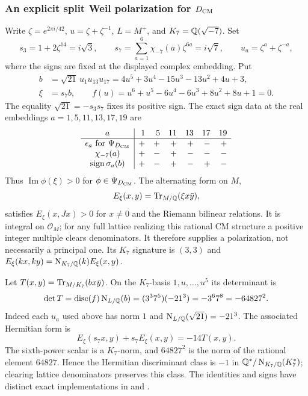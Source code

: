 \subsubsection{An explicit split Weil polarization for ${D_{\mathrm{CM}}}$}
Write $\zeta=e^{2\pi i/42}$, $u=\zeta+\zeta^{-1}$,
$L=M^+$, and $K_7=\mathbb Q(\sqrt{-7})$. Set
\[
 s_3=1+2\zeta^{14}=i\sqrt3,\qquad
 s_7=\sum_{a=1}^{6}\chi_{-7}(a)\zeta^{6a}=i\sqrt7,
 \qquad u_a=\zeta^a+\zeta^{-a},
\]
where the signs are fixed at the displayed complex embedding. Put
\begin{align*}
 b&=\sqrt{21}\,u_1u_{13}u_{17}
   =4u^5+3u^4-15u^3-13u^2+4u+3,\\
 \xi&=s_7b,\qquad
 f(u)=u^6+u^5-6u^4-6u^3+8u^2+8u+1=0.
\end{align*}
The equality $\sqrt{21}=-s_3s_7$ fixes its positive sign. The exact
sign data at the real embeddings $a=1,5,11,13,17,19$ are
\[
\begin{array}{c|rrrrrr}
 a&1&5&11&13&17&19\\\hline
 \epsilon_a\text{ for }\Psi_{D_{\mathrm{CM}}}&+&+&+&+&-&+\\
 \chi_{-7}(a)&+&-&+&-&-&-\\
 \operatorname{sign}\sigma_a(b)&+&-&+&-&+&-
\end{array}
\]
Thus $\operatorname{Im}\phi(\xi)>0$ for $\phi\in\Psi_{D_{\mathrm{CM}}}$.
The alternating form on $M$,
\[
 E_\xi(x,y)=\operatorname{Tr}_{M/\mathbb Q}(\xi x\bar y),
\]
satisfies $E_\xi(x,Jx)>0$ for $x\ne0$ and the Riemann bilinear
relations. It is integral on $\mathcal O_M$; for any full lattice
realizing this rational CM structure a positive integer multiple clears
denominators. It therefore supplies a polarization, not necessarily a
principal one. Its $K_7$ signature is $(3,3)$ and
$E_\xi(kx,ky)=\operatorname{N}_{K_7/\mathbb Q}(k)E_\xi(x,y)$.

Let $T(x,y)=\operatorname{Tr}_{M/K_7}(bx\bar y)$. On the $K_7$-basis
$1,u,\ldots,u^5$ its determinant is
\[
 \det T=\operatorname{disc}(f)\operatorname{N}_{L/\mathbb Q}(b)
       =(3^3 7^5)(-21^3)=-3^6 7^8=-64827^2.
\]
Indeed each $u_a$ used above has norm $1$ and
$\operatorname{N}_{L/\mathbb Q}(\sqrt{21})=-21^3$. The associated Hermitian form is
\[
 E_\xi(s_7x,y)+s_7E_\xi(x,y)=-14T(x,y).
\]
The sixth-power scalar is a $K_7$-norm, and $64827^2$ is the norm of
the rational element $64827$. Hence the Hermitian discriminant class
is $-1$ in $\mathbb Q^*/\operatorname{N}_{K_7/\mathbb Q}(K_7^*)$; clearing lattice denominators
preserves this class. The identities and signs have distinct exact
implementations in
and .

